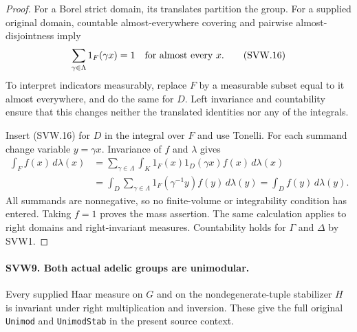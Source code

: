 \documentclass[11pt,a4paper]{article}
\numberwithin{equation}{section}
\theoremstyle{remark}\newtheorem{remark}[theorem]{Remark}
\begin{document}
\begin{proof}
For a Borel strict domain, its translates partition the group.
For a supplied original domain, countable almost-everywhere
covering and pairwise almost-disjointness imply
\[
                  \sum_{\gamma\in\Lambda}1_F(\gamma x)=1
                         \quad\hbox{for almost every }x.
 \tag{SVW.16}
\]
To interpret indicators measurably, replace $F$ by a measurable
subset equal to it almost everywhere, and do the same for $D$.
Left invariance and countability ensure that this changes neither
the translated identities nor any of the integrals.

Insert (SVW.16) for $D$ in the integral over $F$ and use Tonelli.
For each summand change variable $y=\gamma x$.  Invariance of $f$
and $\lambda$ gives
\[
 \begin{split}
 \int_F f(x)\,d\lambda(x)
 &=\sum_{\gamma\in\Lambda}
      \int_K1_F(x)1_D(\gamma x)f(x)\,d\lambda(x)\\
 &=\int_D\sum_{\gamma\in\Lambda}1_F(\gamma^{-1}y)
                                     f(y)\,d\lambda(y)
 =\int_D f(y)\,d\lambda(y).
 \end{split}
 \tag{SVW.17}
\]
All summands are nonnegative, so no finite-volume or integrability
condition has entered.  Taking $f=1$ proves the mass assertion.
The same calculation applies to right domains and right-invariant
measures.  Countability holds for $\Gamma$ and $\Delta$ by SVW1.
\end{proof}

\paragraph{SVW9. Both actual adelic groups are unimodular.}
\label{claim:SVW9}
Every supplied Haar measure on $G$ and on the nondegenerate-tuple
stabilizer $H$ is invariant under right multiplication and inversion.
These give the full original \texttt{Unimod} and
\texttt{Unimod\allowbreak Stab} in the present source context.
\end{document}
